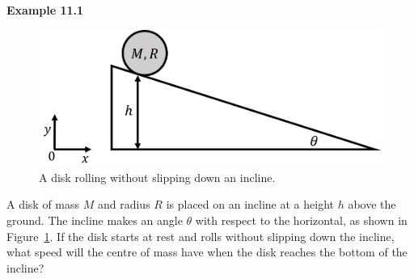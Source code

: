 \begin{framed}
\textbf{Example 11.1}\\
\begin{figure}[!htbp]
\centering
\includegraphics[width=0.5\linewidth]{files/diskslope-7e1ab66d6b3e0fd4d814dc76ee898212.png}
\caption[]{A disk rolling without slipping down an incline.}
\label{fig:angularmomentumrolling:diskslope}
\end{figure}

A disk of mass $M$ and radius $R$ is placed on an incline at a height $h$ above the ground. The incline makes an angle $\theta$ with respect to the horizontal, as shown in Figure~\ref{fig:angularmomentumrolling:diskslope}. If the disk starts at rest and rolls without slipping down the incline, what speed will the centre of mass have when the disk reaches the bottom of the incline?


\end{framed}
